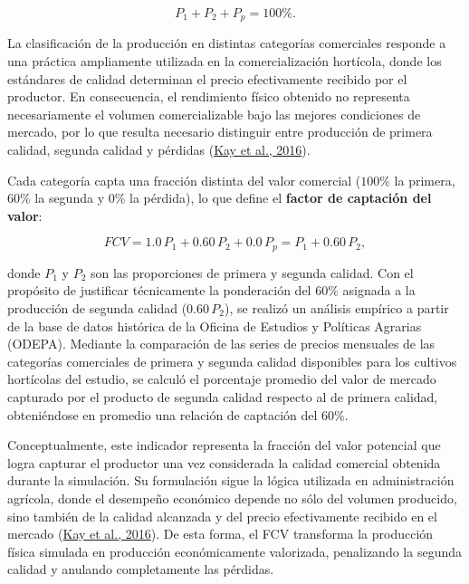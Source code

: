 \documentclass[12pt]{report}
\newcommand{\citeref}[2]{\hyperlink{ref:#1}{#2}}
\begin{document}
\vspace{0.2cm}

\begin{equation}
P_1 + P_2 + P_p = 100\%.
\end{equation}

\vspace{0.2cm}

La clasificación de la producción en distintas categorías comerciales responde a una práctica ampliamente utilizada en la comercialización hortícola, donde los estándares de calidad determinan el precio efectivamente recibido por el productor. En consecuencia, el rendimiento físico obtenido no representa necesariamente el volumen comercializable bajo las mejores condiciones de mercado, por lo que resulta necesario distinguir entre producción de primera calidad, segunda calidad y pérdidas (\citeref{kay2019}{Kay et al., 2016}).

\vspace{0.2cm}

Cada categoría capta una fracción distinta del valor comercial ($100\%$ la primera, $60\%$ la segunda y $0\%$ la pérdida), lo que define el \textbf{factor de captación del valor}:

\vspace{0.2cm}

\begin{equation}
FCV = 1.0\,P_1 + 0.60\,P_2 + 0.0\,P_p = P_1 + 0.60\,P_2,
\end{equation}

\vspace{0.2cm}

donde $P_1$ y $P_2$ son las proporciones de primera y segunda calidad. Con el propósito de justificar técnicamente la ponderación del $60\%$ asignada a la producción de segunda calidad ($0.60\,P_2$), se realizó un análisis empírico a partir de la base de datos histórica de la Oficina de Estudios y Políticas Agrarias (ODEPA). Mediante la comparación de las series de precios mensuales de las categorías comerciales de primera y segunda calidad disponibles para los cultivos hortícolas del estudio, se calculó el porcentaje promedio del valor de mercado capturado por el producto de segunda calidad respecto al de primera calidad, obteniéndose en promedio una relación de captación del $60\%$.

Conceptualmente, este indicador representa la fracción del valor potencial que logra capturar el productor una vez considerada la calidad comercial obtenida durante la simulación. Su formulación sigue la lógica utilizada en administración agrícola, donde el desempeño económico depende no sólo del volumen producido, sino también de la calidad alcanzada y del precio efectivamente recibido en el mercado (\citeref{kay2019}{Kay et al., 2016}). De esta forma, el FCV transforma la producción física simulada en producción económicamente valorizada, penalizando la segunda calidad y anulando completamente las pérdidas.
\end{document}
